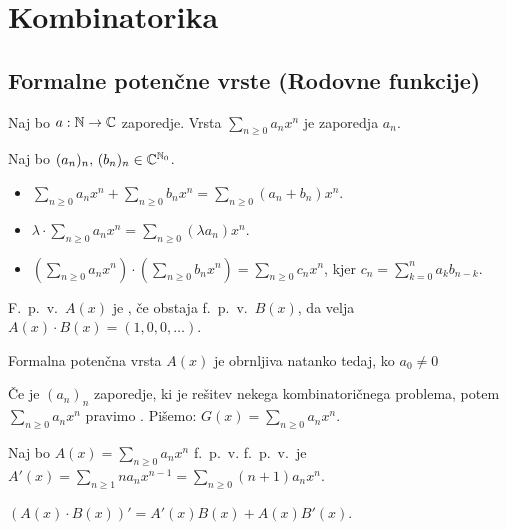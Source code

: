 \section{Kombinatorika}
\subsection{Formalne potenčne vrste (Rodovne funkcije)}
\begin{definicija}
    Naj bo $a: \mathbb{N} \to \mathbb{C}$ zaporedje. Vrsta $\sum_{n \geq 0}a_n x^n$ je  zaporedja $a_n$.
\end{definicija}

\begin{definicija}
    Naj bo $(a_n)_n, \, (b_n)_n \in \mathbb{C}^{\mathbb{N}_0}$.
    \begin{itemize}
        \item $\sum_{n \geq 0}a_n x^n + \sum_{n \geq 0}b_n x^n = \sum_{n \geq 0}(a_n + b_n) x^n$.
        \item $\lambda \cdot \sum_{n \geq 0}a_n x^n = \sum_{n \geq 0}(\lambda a_n) x^n$.
        \item $(\sum_{n \geq 0}a_n x^n) \cdot (\sum_{n \geq 0}b_n x^n) = \sum_{n \geq 0}c_n x^n$, kjer $c_n = \sum_{k=0}^{n}a_kb_{n-k}$.
    \end{itemize}
\end{definicija}

\begin{definicija}
    F.\ p.\ v.\ $A(x)$ je , če obstaja f.\ p.\ v.\ $B(x)$, da velja $A(x) \cdot B(x) = (1, 0, 0, \ldots)$.
\end{definicija}

\begin{trditev}
    Formalna potenčna vrsta $A(x)$ je obrnljiva natanko tedaj, ko $a_0 \neq 0$
\end{trditev}

\begin{definicija}
    Če je $(a_n)_n$ zaporedje, ki je rešitev nekega kombinatoričnega problema, potem $\sum_{n \geq 0}a_n x^n$ pravimo . Pišemo: $G(x) = \sum_{n \geq 0}a_n x^n$.
\end{definicija}

\begin{definicija}
    Naj bo $A(x) = \sum_{n \geq 0}a_n x^n$ f.\ p.\ v.  f.\ p.\ v.\ je $A'(x) =  \sum_{n \geq 1}na_n x^{n-1} =  \sum_{n \geq 0}(n+1)a_n x^n$.
\end{definicija}

\begin{trditev}
    $(A(x) \cdot B(x))' = A'(x)B(x) + A(x)B'(x)$.
\end{trditev}

